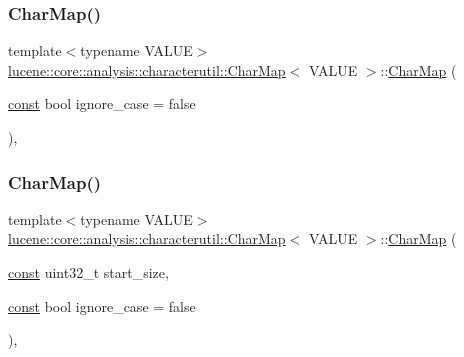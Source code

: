 \subsubsection{\texorpdfstring{Char\+Map()}{CharMap()}\hspace{0.1cm}{\footnotesize\ttfamily [1/5]}}
{\footnotesize\ttfamily template$<$typename V\+A\+L\+UE$>$ \\
\mbox{\hyperlink{classlucene_1_1core_1_1analysis_1_1characterutil_1_1CharMap}{lucene\+::core\+::analysis\+::characterutil\+::\+Char\+Map}}$<$ V\+A\+L\+UE $>$\+::\mbox{\hyperlink{classlucene_1_1core_1_1analysis_1_1characterutil_1_1CharMap}{Char\+Map}} (\begin{DoxyParamCaption}\item[{\mbox{\hyperlink{ZlibCrc32_8h_a2c212835823e3c54a8ab6d95c652660e}{const}} bool}]{ignore\+\_\+case = {\ttfamily false} }\end{DoxyParamCaption})\hspace{0.3cm}{\ttfamily [inline]}, {\ttfamily [explicit]}}

\mbox{\label{classlucene_1_1core_1_1analysis_1_1characterutil_1_1CharMap_a797c76287d00853e737c8fcd8006769d}} 
\subsubsection{\texorpdfstring{Char\+Map()}{CharMap()}\hspace{0.1cm}{\footnotesize\ttfamily [2/5]}}
{\footnotesize\ttfamily template$<$typename V\+A\+L\+UE$>$ \\
\mbox{\hyperlink{classlucene_1_1core_1_1analysis_1_1characterutil_1_1CharMap}{lucene\+::core\+::analysis\+::characterutil\+::\+Char\+Map}}$<$ V\+A\+L\+UE $>$\+::\mbox{\hyperlink{classlucene_1_1core_1_1analysis_1_1characterutil_1_1CharMap}{Char\+Map}} (\begin{DoxyParamCaption}\item[{\mbox{\hyperlink{ZlibCrc32_8h_a2c212835823e3c54a8ab6d95c652660e}{const}} uint32\+\_\+t}]{start\+\_\+size,  }\item[{\mbox{\hyperlink{ZlibCrc32_8h_a2c212835823e3c54a8ab6d95c652660e}{const}} bool}]{ignore\+\_\+case = {\ttfamily false} }\end{DoxyParamCaption})\hspace{0.3cm}{\ttfamily [inline]}, {\ttfamily [explicit]}}

